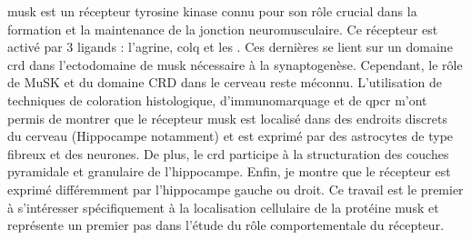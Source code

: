 \Acrshort{musk} est un récepteur tyrosine kinase connu pour son rôle crucial dans la formation et la maintenance de la jonction neuromusculaire. Ce récepteur est activé par 3 ligands : l’agrine, \acrshort{colq}  et les . Ces dernières se lient sur un domaine \acrshort{crd} dans l’ectodomaine de \acrshort{musk} nécessaire à la synaptogenèse. Cependant, le rôle de MuSK et du domaine CRD dans le cerveau reste méconnu. L'utilisation de techniques de coloration histologique, d'immunomarquage et de \acrshort{qpcr} m'ont permis de montrer que le récepteur \acrshort{musk} est localisé dans des endroits discrets du cerveau (Hippocampe notamment) et est exprimé par des astrocytes de type fibreux et des neurones. De plus, le \acrshort{crd} participe à la structuration des couches pyramidale et granulaire de l'hippocampe. Enfin, je montre que le récepteur est exprimé différemment par l'hippocampe gauche ou droit. Ce travail est le premier à s'intéresser spécifiquement à la localisation cellulaire de la protéine \acrshort{musk} et représente un premier pas dans l'étude du rôle comportementale du récepteur.